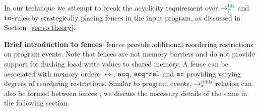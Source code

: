 %

In our technique we attempt to break the acyclicity requirement over
$\setHB$ and $\lto$-rules by strategically placing \cc fences in 
the input program, as discussed in Section~\ref{sec:so theory}.

\noindent
{\bf Brief introduction to \cc fences}: 
\cc fences provide additional reordering restrictions on program 
events. Note that \cc fences are not memory barriers and do not
provide support for flushing local write values to shared memory.
%
A fence can be associated with memory orders $\rel$, $\acq$, 
$\acqrel$ and $\sc$
providing varying degrees of reordering restrictions.
%
Similar to program events, $\setITHB$ relation can also be formed 
between \cc fences 
\cite{batty2011mathematizing}\cite{C11}, we discuss the necessary
details of the same in the following section.
